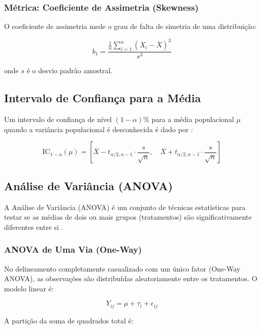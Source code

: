 \documentclass[12pt,a4paper,oneside]{article}
\begin{document}
\subsubsection{Métrica: Coeficiente de Assimetria (Skewness)}

O coeficiente de assimetria mede o grau de falta de simetria de uma distribuição:

\begin{equation}
b_1 = \frac{\frac{1}{n}\sum_{i=1}^{n}(X_i - \overline{X})^3}{s^3}
\end{equation}

onde $s$ é o desvio padrão amostral.

\subsection{Intervalo de Confiança para a Média}

Um intervalo de confiança de nível $(1-\alpha)\%$ para a média populacional $\mu$ quando a variância populacional é desconhecida é dado por \cite{devore2015}:

\begin{equation}
\text{IC}_{1-\alpha}(\mu) = \left[\overline{X} - t_{\alpha/2, n-1} \cdot \frac{s}{\sqrt{n}}, \quad \overline{X} + t_{\alpha/2, n-1} \cdot \frac{s}{\sqrt{n}}\right]
\end{equation}

\subsection{Análise de Variância (ANOVA)}

A Análise de Variância (ANOVA) é um conjunto de técnicas estatísticas para testar se as médias de dois ou mais grupos (tratamentos) são significativamente diferentes entre si \cite{montgomery2013}.

\subsubsection{ANOVA de Uma Via (One-Way)}

No delineamento completamente casualizado com um único fator (One-Way ANOVA), as observações são distribuídas aleatoriamente entre os tratamentos. O modelo linear é:

\begin{equation}
Y_{ij} = \mu + \tau_i + \epsilon_{ij}
\end{equation}

A partição da soma de quadrados total é:
\end{document}
